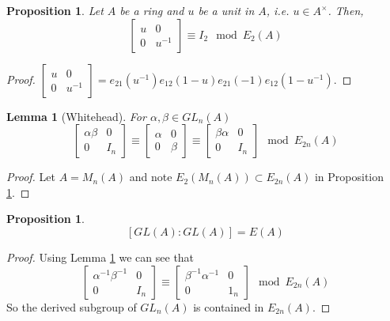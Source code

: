 \documentclass[12pt]{report}
\numberwithin{equation}{section}
\newcounter{dummy} \numberwithin{dummy}{section}
\newtheorem{lemma}[dummy]{Lemma}
\newtheorem{proposition}[dummy]{Proposition}
\begin{document}
	\begin{proposition}\label{whiteheadsimple}
		Let $A$ be a ring and $u$ be a unit in $A$, i.e. $u \in A^\times$. Then,
		\[ {\displaystyle {\begin{bmatrix}u&0\\0&u^{-1}\end{bmatrix}}} \equiv I_2 \mod E_2(A)\]
	\end{proposition}
	\begin{proof}
		${\displaystyle {\begin{bmatrix}u&0\\0&u^{-1}\end{bmatrix}}=e_{21}(u^{-1})e_{12}(1-u)e_{21}(-1)e_{12}(1-u^{-1}).}$
	\end{proof}
	\begin{lemma}[Whitehead]\label{whiteheadmain}
		For $\alpha,\beta \in GL_n(A)$ \[ \begin{bmatrix}
			\alpha \beta & 0 \\ 0 & I_n
		\end{bmatrix} \equiv \begin{bmatrix} \alpha & 0 \\ 0 & \beta
		\end{bmatrix} \equiv \begin{bmatrix}
			\beta \alpha  & 0 \\ 0 & I_n 
		\end{bmatrix} \mod E_{2n} (A)\]
	\end{lemma}
	\begin{proof}
		Let $A=M_n(A)$ and note $E_2(M_n(A) ) \subset E_{2n}(A)$ in Proposition \ref{whiteheadsimple}.
	\end{proof}
		\begin{proposition}
		\[ [GL(A):GL(A)]=E(A) \]
	\end{proposition}
	\begin{proof}
		Using Lemma \ref{whiteheadmain} we can see that \[ \begin{bmatrix}
			\alpha^{-1}\beta^{-1} & 0 \\ 0 & I_n
		\end{bmatrix} \equiv \begin{bmatrix}
			\beta^{-1} \alpha^{-1 } & 0 \\
			0 & 1_n
		\end{bmatrix} \mod E_{2n}(A)\]
		So the derived subgroup of $GL_n(A)$ is contained in $E_{2n}(A)$. 
	\end{proof}	
	
\end{document}
